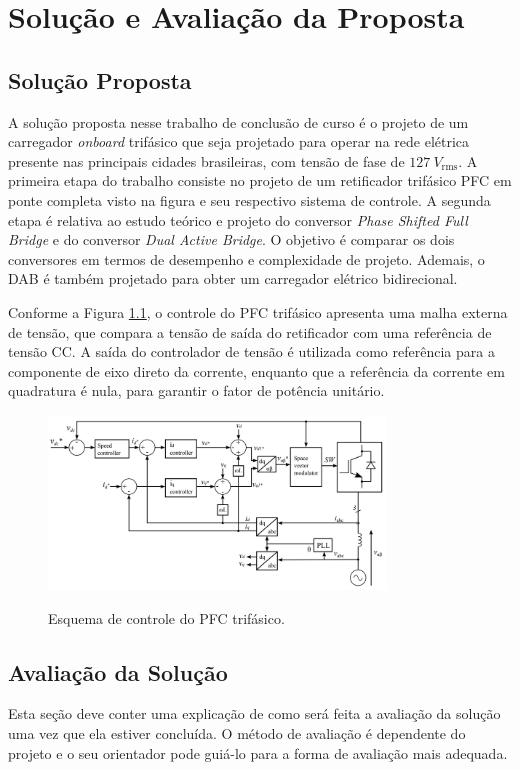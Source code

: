 \chapter{Solução e Avaliação da Proposta}
\section{Solução Proposta}

A solução proposta nesse trabalho de conclusão de curso é o projeto de um carregador
\textit{onboard} trifásico que seja projetado para operar na rede elétrica presente nas
principais cidades brasileiras, com tensão de fase de \(127\ V_\mathrm{rms}\). A primeira etapa
do trabalho consiste no projeto de um retificador trifásico PFC em ponte completa visto na
figura e seu respectivo sistema de controle. A segunda etapa é relativa ao estudo teórico e
projeto do conversor \textit{Phase Shifted Full Bridge} e do conversor \textit{Dual Active
    Bridge}. O objetivo é comparar os dois conversores em termos de desempenho e complexidade de
projeto. Ademais, o DAB é também projetado para obter um carregador elétrico bidirecional.

Conforme a Figura \ref{fig:controlepfc3ph}, o controle do PFC trifásico apresenta uma malha
externa de tensão, que compara a tensão de saída do retificador com uma referência de tensão
CC. A saída do controlador de tensão é utilizada como referência para a componente de eixo
direto da corrente, enquanto que a referência da corrente em quadratura é nula, para garantir o
fator de potência unitário.

\begin{figure}
    \centering
    \caption{Esquema de controle do PFC trifásico.}
    \includegraphics[width=0.8\textwidth]{./Figuras/controlepfc3ph.png}
    \label{fig:controlepfc3ph}
\end{figure}

\section{Avaliação da Solução}
Esta seção deve conter uma explicação de como será feita a avaliação da solução uma vez que ela
estiver concluída. O método de avaliação é dependente do projeto e o seu orientador pode
guiá-lo para a forma de avaliação mais adequada.
